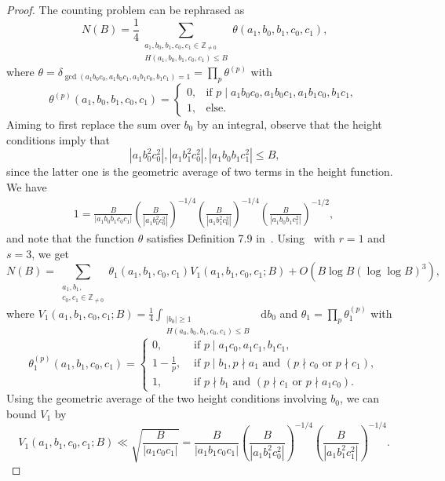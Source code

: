 \documentclass[a4paper, twoside, 10pt]{amsart}
\newcommand*\diff{\mathop{}\!\mathrm{d}}
\newcommand{\ZZnz}{\mathbb{Z}_{\neq{}0}}
\newcommand{\abs}[1]{\left\lvert#1\right\rvert}
\theoremstyle{definition}
\begin{document}
\begin{proof}
  The counting problem can be rephrased as
  \[
    N(B)=\frac{1}{4}\sum_{\substack{a_1,b_0,b_1,c_0,c_1\in\ZZnz\\H(a_1,b_0,b_1,c_0,c_1)\leq B}} \theta(a_1,b_0,b_1,c_0,c_1) \text{,}
  \]
  where $\theta = \delta_{\gcd(a_1b_0c_0,a_1b_0c_1,a_1b_1c_0,b_1c_1)=1}=\prod_p \theta^{(p)}$ with
  \[
    \theta^{(p)}(a_1,b_0,b_1,c_0,c_1)=\begin{cases}
      0, & \text{if } p\mid a_1b_0c_0 , a_1b_0c_1 , a_1b_1c_0 , b_1c_1, \\
      1, & \text{else.}
    \end{cases}
  \]
  Aiming to first replace the sum over $b_0$ by an integral, observe that
  the height conditions imply that
  \[
  \abs{a_1b_0^2c_0^2}, \abs{a_1b_1^2c_0^2}, \abs{a_1b_0b_1c_1^2}\leq B\text{,}
  \]
  since the latter one is the geometric average of two terms in the height function. We have
  \begin{align*}
    1= \frac{B}{\abs{a_1b_0b_1c_0c_1}}
    \left(\frac{B}{\abs{a_1b_0^2c_0^2}}\right)^{-1/4}
    \left(\frac{B}{\abs{a_1b_1^2c_0^2}}\right)^{-1/4}
    \left(\frac{B}{\abs{a_1b_0b_1c_1^2}}\right)^{-1/2},
  \end{align*}
  and note that the function $\theta$
  satisfies Definition 7.9 in~\cite{MR2520770}.
  Using~\cite[Prop.~3.9]{MR2520770} with $r=1$ and $s=3$, we get
  \[
    N(B)=\sum_{\substack{a_1,b_1,\\c_0,c_1\in\ZZnz}} \theta_1(a_1,b_1,c_0,c_1) V_1(a_1,b_1,c_0,c_1;B) +O(B\log B(\log\log B)^3)\text{,}
  \]
  where $V_1(a_1,b_1,c_0,c_1;B) = \frac{1}{4}\int_{\substack{\abs{b_0}\geq 1 \\ H(a_0,b_0,b_1,c_0,c_1)\leq B}} \diff b_0$
  and $\theta_1=\prod_p\theta_1^{(p)}$ with
  \[
    \theta_1^{(p)}(a_1,b_1,c_0,c_1) = \begin{cases}
      0, & \text{ if } p \mid  a_1 c_0, a_1c_1 , b_1c_1, \\
      1-\frac{1}{p}, & \text{ if } p \mid b_1, p\nmid a_1 \text{ and } (p\nmid c_0 \text{ or } p\nmid c_1),\\
      1, & \text{ if } p \nmid b_1 \text{ and } (p\nmid c_1 \text{ or } p\nmid a_1c_0) \text{.}
    \end{cases}
  \]
  Using the geometric average of the two height conditions involving $b_0$, we can bound $V_1$ by
  \[
    V_1(a_1,b_1,c_0,c_1;B) \ll \sqrt{\frac{B}{\abs{a_1c_0c_1}}} = \frac{B}{\abs{a_1b_1c_0c_1}}
    \left(\frac{B}{\abs{a_1b_1^2c_0^2}}\right)^{-1/4}
    \left(\frac{B}{\abs{a_1b_1^2c_1^2}}\right)^{-1/4}\text{.}
\]
\end{proof}
\end{document}
